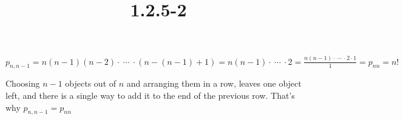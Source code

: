 \documentclass{article}
\title{1.2.5-2}
\begin{document}
\maketitle

\( p_{n,n-1} = n(n-1)(n-2) \cdot\ \cdots\ \cdot (n-(n-1)+1) = n(n-1) \cdot\ \cdots\ \cdot 2 = \frac{n(n-1) \cdot\ \cdots\ \cdot 2 \cdot 1}{1} = p_{nn} = n! \)

Choosing \( n - 1 \) objects out of \( n \) and arranging them in a row, leaves one object left, and there is a single way to add it to the end of the previous row. That's why \( p_{n,n-1} = p_{nn} \)
\end{document}
